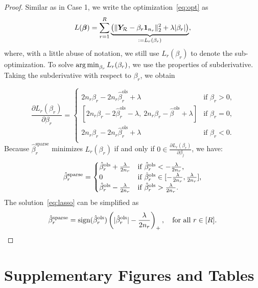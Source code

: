 \documentclass{article}
\newcommand*{\KeepStyleUnderBrace}[1]{%
  \mathop{%
    \mathchoice
    {\underbrace{\displaystyle#1}}%
    {\underbrace{\textstyle#1}}%
    {\underbrace{\scriptstyle#1}}%
    {\underbrace{\scriptscriptstyle#1}}%
  }\limits
}
\begin{document}
\begin{appendices}
\begin{proof}
Similar as in Case 1, we write the optimization~\eqref{eq:opt} as
\[
L({\bm \beta})=\sum_{r=1}^R\KeepStyleUnderBrace{\left(\vnormSize{}{\mY_{\tR}-\beta_r\mathbf{1}_{n_r}}^2+\lambda |\beta_{r}|\right)}_{:=L_r(\beta_r)},
\]
where, with a little abuse of notation, we still use $L_r(\beta_r)$ to denote the sub-optimization. To solve $\operatorname*{arg\,min}_{\beta_r}L_r(\beta_r)$, we use the properties of subderivative. Taking the subderivative with respect to $\beta_r$, we obtain
	
\begin{equation}
\frac{\partial L_r(\beta_r)}{\partial \beta_r} = 
\begin{cases}
2n_r\beta_r-2n_r\hat \beta^{\text{ols}}_r+\lambda &\mbox{if $\beta_r>0$,}\\
 [2n_r\beta_r-2\hat \beta^{\text{ols}}_r-\lambda, \ 2n_r\beta_r-\hat \beta^{\text{ols}}+\lambda]&\mbox{if $\beta_r=0$,}\\
2n_r\beta_r-2n_r\hat \beta^{\text{ols}}_r+\lambda &\mbox{if $\beta_r<0$.}\\
\end{cases}
\end{equation}
Because $\hat \beta^{\text{sparse}}_r$ minimizes $L_r(\beta_r)$ if and only if $0 \in \frac{\partial L_r(\beta_r)}{\partial \beta_j}$, we have:
\begin{equation}\label{eq:lasso}
\hat \beta^{\text{sparse}}_r=
\begin{cases}
\hat \beta^{\text{ols}}_r+{\lambda\over 2n_r}&\mbox{if $\hat \beta^{\text{ols}}_r<-{\lambda \over 2n_r}$,}\\
0 &\mbox{if $\hat \beta^{\text{ols}}_r\in[-{\lambda \over 2n_r},{\lambda \over 2n_r}]$,}\\
\hat \beta^{\text{ols}}_r-{\lambda\over 2n_r}&\mbox{if $\hat \beta^{\text{ols}}_r>{\lambda \over 2n_r}$.}\\
\end{cases}
\end{equation}
The solution~\eqref{eq:lasso} can be simplified as 
\[
\hat \beta^{\text{sparse}}_r=\text{sign}(\hat \beta^{\text{ols}}_r)\left(|\hat \beta^{\text{ols}}_r|-{\lambda\over 2n_r}\right)_{+},\quad \text{for all $r\in[R]$}.
\]
\qedhere
\end{proof}

\section{Supplementary Figures and Tables}


\end{appendices}
\end{document}
